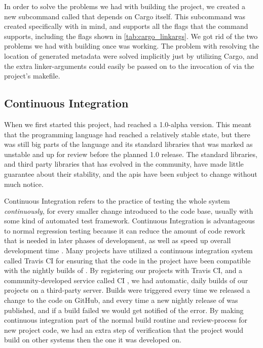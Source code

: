 In order to solve the problems we had with building the project, we created a new subcommand called  \cite{github:cargo_linkargs} that depends on Cargo itself.
This subcommand was created specifically with {\emlib} in mind, and supports all the flags that the  command supports, including the flags shown in \autoref{tab:cargo_linkargs}.
We got rid of the two problems we had with building {\emlib} once  was working.
The problem with resolving the location of generated metadata were solved implicitly just by utilizing Cargo, and the extra linker-arguments could easily be passed on to the invocation of  via the project's makefile.

\subsection{Continuous Integration}
\label{ssub:continuous_integration}

When we first started this project, {\rust} had reached a 1.0-alpha version.
This meant that the programming language had reached a relatively stable state, but there was still big parts of the language and its standard libraries that was marked as unstable and up for review before the planned 1.0 release.
The standard libraries, and third party {\rust} libraries that has evolved in the {\rust} community, have made little guarantee about their stability, and the \glspl{api} have been subject to change without much notice.

Continuous Integration refers to the practice of testing the whole system \emph{continuously}, for every smaller change introduced to the code base, usually with some kind of automated test framework.
Continuous Integration is advantageous to normal regression testing because it can reduce the amount of code rework that is needed in later phases of development, as well as speed up overall development time  \cite{Orso2014}.
Many {\rust} projects have utilized a continuous integration system called Travis CI \cite{web:travis_ci} for ensuring that the code in the project have been compatible with the nightly builds of {\rust}.
By registering our projects with Travis CI, and a community-developed service called {\rust} CI \cite{web:rust_ci}, we had automatic, daily builds of our projects on a third-party server.
Builds were triggered every time we released a change to the code on GitHub, and every time a new nightly release of {\rust} was published, and if a build failed we would get notified of the error.
By making continuous integration part of the normal build routine and review-process for new project code, we had an extra step of verification that the project would build on other systems then the one it was developed on.

